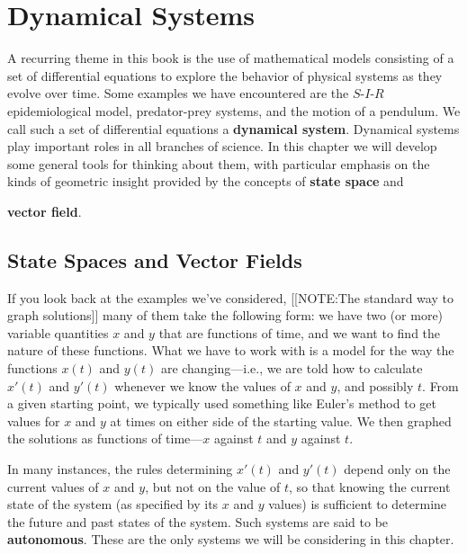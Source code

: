 
\chapter{Dynamical Systems}
\label{chap:dynamical-systems}

A recurring theme in this book is the use of mathematical models
consisting of a set of differential equations to explore the behavior
of physical systems as they evolve over time.  Some examples we have
encountered are the $S$-$I$-$R$ epidemiological model, predator-prey
systems, and the motion of a pendulum. We call such a set of
differential equations a {\bf dynamical system}. Dynamical systems play important roles in all branches of
science.  In this chapter we will develop some general tools for
thinking about them, with particular emphasis on the kinds of
geometric insight provided by the concepts of {\bf state space} and

{\bf vector field}.

\section{State Spaces and Vector Fields}
\label{sec:state-spaces-and-vector-fields}

If you look back at the examples we've considered, 
[[NOTE:The standard way  to graph solutions]]
many of them take the following form: we have two (or more) variable
quantities $x$ and $y$ that are functions of time, and we want to find
the nature of these functions.  What we have to work with is a model
for the way the functions $x(t)$ and $y(t)$ are changing---i.e., we
are told how to calculate $x'(t)$ and $y'(t)$ whenever we know the
values of $x$ and $y$, and possibly $t$.  From a given starting point,
we typically used something like Euler's method to get values for $x$
and $y$ at times on either side of the starting value.  We then
graphed the solutions as functions of time---$x$ against $t$ and $y$
against $t$.

In many instances, the rules determining $x'(t)$ and $y'(t)$ depend
only on the current values of $x$ and $y$, but not on the value of
$t$, so that knowing the current state of the system (as specified by
its $x$ and $y$ values) is sufficient to determine the future and past
states of the system.  Such systems are said to be {\bf
  autonomous}.  These are the only
systems we will be considering in this chapter.

